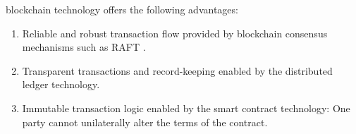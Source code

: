 

blockchain technology offers the following advantages:
\begin{enumerate}
    \item Reliable and robust transaction flow provided by blockchain consensus mechanisms such as RAFT \cite{Ongaro:raft}.
    \item Transparent transactions and record-keeping enabled by the distributed ledger technology.
    \item Immutable transaction logic enabled by the smart contract technology: One party cannot unilaterally alter the terms of the contract.
\end{enumerate}


